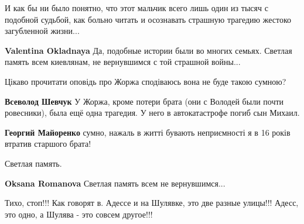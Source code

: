\begin{itemize}

И как бы ни было понятно, что этот мальчик всего лишь один из тысяч с подобной
судьбой, как больно читать и осознавать страшную трагедию жестоко загубленной
жизни...

\begin{itemize} %
\textbf{Valentina Okladnaya} Да, подобные истории были во многих семьях. Светлая память всем киевлянам, не вернувшимся с той страшной войны...
\end{itemize} %

Цікаво прочитати оповідь про Жоржа сподіваюсь вона не буде такою сумною?

\begin{itemize} %
\textbf{Всеволод Шевчук} У Жоржа, кроме потери брата (они с Володей были почти ровесники), была ещё одна трагедия. У него в автокатастрофе погиб сын Михаил.

\textbf{Георгий Майоренко} сумно, нажаль в житті бувають неприємності я в 16 років втратив старшого брата!
\end{itemize} %

Светлая память.

\textbf{Oksana Romanova} Светлая память всем не вернувшимся...

Тихо, стоп!!! Как говорят в. Адессе и на Шулявке, это две разные улицы!!! Адесс, это одно, а Шулява - это совсем другое!!!
\end{itemize} %
